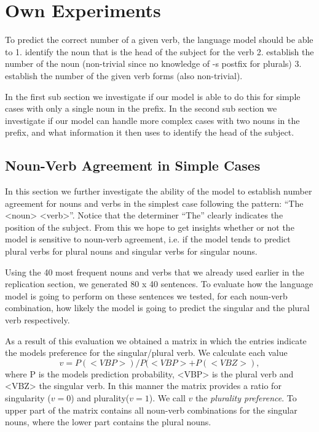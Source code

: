 \section{Own Experiments}
\label{own-experiments}
To predict the correct number of a given verb,
the language model should be able to
1. identify the noun that is the head of the subject for the verb
2. establish the number of the noun (non-trivial since no knowledge of -s postfix for plurals)
3. establish the number of the given verb forms (also non-trivial).

In the first sub section we investigate if our model is able to
do this for simple cases with only a single noun in the prefix.
%
In the second sub section we investigate if our model can handle
more complex cases with two nouns in the prefix,
and what information it then uses to identify the head of the subject.


\subsection{Noun-Verb Agreement in Simple Cases}

In this section we further investigate the ability of the model to
establish number agreement for nouns and verbs in the simplest case
following the pattern: ``The <noun> <verb>''. Notice that
the determiner ``The'' clearly indicates the position of the subject.
From this we hope to get insights whether or not the model is sensitive to noun-verb agreement, i.e. if the model tends to predict plural verbs for plural nouns and singular verbs for singular nouns.


Using the 40 most frequent nouns and verbs that we already used earlier in the replication section, we generated 80 x 40 sentences. To evaluate how the language model is going to perform on these sentences we tested, for each noun-verb combination, how likely the model is going to predict the singular and the plural verb respectively.

As a result of this evaluation we obtained a matrix in which the entries indicate the models preference for the singular/plural verb. We calculate each value
\begin{equation}
	v = P(<VBP>)/ P(<VBP> + P(<VBZ>), 
\end{equation}
where P is the models prediction probability, <VBP> is the plural verb and <VBZ> the singular verb. In this manner the matrix provides a ratio for singularity ($v=0$) and plurality($v=1$). We call $v$ the \textit{plurality preference}. To upper part of the matrix contains all noun-verb combinations for the singular nouns, where the lower part contains the plural nouns. 

